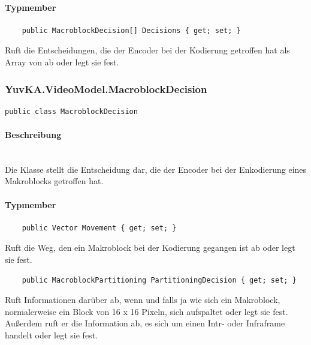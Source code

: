 \paragraph{Typmember}
\begin{itemize}

	\begin{verbatim}
	public MacroblockDecision[] Decisions { get; set; }
	\end{verbatim}
	Ruft die Entscheidungen, die der Encoder bei der Kodierung getroffen hat als Array von  ab oder legt sie fest.

\end{itemize}

\subsubsection{YuvKA.VideoModel.MacroblockDecision}

\begin{verbatim}
public class MacroblockDecision
\end{verbatim}

\paragraph{Beschreibung}~\\
Die Klasse  stellt die Entscheidung dar, die der Encoder bei der Enkodierung eines Makroblocks getroffen hat.

\paragraph{Typmember}
\begin{itemize}

	\begin{verbatim}
	public Vector Movement { get; set; }
	\end{verbatim}
	Ruft die Weg, den ein Makroblock bei der Kodierung gegangen ist ab oder legt sie fest.

	\begin{verbatim}
	public MacroblockPartitioning PartitioningDecision { get; set; }
	\end{verbatim}
	Ruft Informationen darüber ab, wenn und falls ja wie sich ein Makroblock, normalerweise ein Block von 16 x 16 Pixeln, sich aufspaltet oder legt sie fest. Außerdem ruft er die Information ab, es sich um einen Intr- oder Infraframe handelt oder legt sie fest.

\end{itemize}
